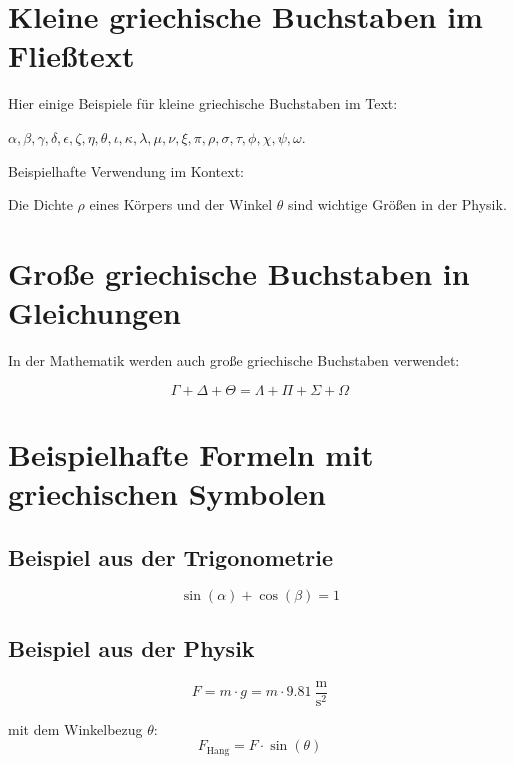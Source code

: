 \documentclass[a4paper,12pt]{article}
\begin{document}
\section{Kleine griechische Buchstaben im Fließtext}

Hier einige Beispiele für kleine griechische Buchstaben im Text:

\noindent $\alpha, \beta, \gamma, \delta, \epsilon, \zeta, \eta, \theta, \iota, \kappa, \lambda, \mu, \nu, \xi, \pi, \rho, \sigma, \tau, \phi, \chi, \psi, \omega$.

\noindent Beispielhafte Verwendung im Kontext:

\noindent Die Dichte $\rho$ eines Körpers und der Winkel $\theta$ sind wichtige Größen in der Physik.

\section{Große griechische Buchstaben in Gleichungen}

In der Mathematik werden auch große griechische Buchstaben verwendet:

\[
\Gamma + \Delta + \Theta = \Lambda + \Pi + \Sigma + \Omega
\] 



\section{Beispielhafte Formeln mit griechischen Symbolen}


\subsection{Beispiel aus der Trigonometrie}

\[
\sin(\alpha) + \cos(\beta) = 1
\]

\subsection{Beispiel aus der Physik}

\[
F = m \cdot g = m \cdot 9.81~\frac{\text{m}}{\text{s}^2}
\]

\noindent mit dem Winkelbezug $\theta$:
\[
F_\text{Hang} = F \cdot \sin(\theta)
\]

\end{document}
